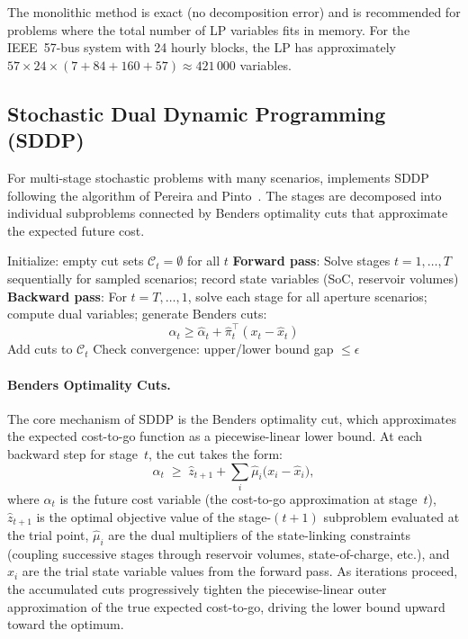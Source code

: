 The monolithic method is exact (no decomposition error) and is recommended
for problems where the total number of LP variables fits in memory.  For
the IEEE~57-bus system with 24 hourly blocks, the LP has approximately
$57 \times 24 \times (7 + 84 + 160 + 57) \approx 421\,000$ variables.

\subsection{Stochastic Dual Dynamic Programming (SDDP)}
\label{sec:sddp}

For multi-stage stochastic problems with many scenarios, \gtopt{} implements
SDDP following the algorithm of Pereira and
Pinto~\cite{pereira1991sddp}.  The stages are decomposed into
individual subproblems connected by Benders optimality cuts that
approximate the expected future cost.

\begin{algorithm}[h]
  \caption{SDDP Algorithm in \gtopt{}}
  \label{alg:sddp}
  \begin{algorithmic}[1]
    \STATE Initialize: empty cut sets $\mathcal{C}_t = \emptyset$
      for all $t$
      \STATE \textbf{Forward pass}: Solve stages $t=1,\ldots,T$
        sequentially for sampled scenarios; record state variables
        (SoC, reservoir volumes)
      \STATE \textbf{Backward pass}: For $t=T,\ldots,1$, solve
        each stage for all aperture scenarios; compute dual
        variables; generate Benders cuts:
        \[
          \alpha_t \geq \hat{\alpha}_t + \hat{\pi}_t^\top
            (x_t - \hat{x}_t)
        \]
      \STATE Add cuts to $\mathcal{C}_t$
      \STATE Check convergence: upper/lower bound gap $\leq \epsilon$
    \ENDFOR
  \end{algorithmic}
\end{algorithm}

\paragraph{Benders Optimality Cuts.}
The core mechanism of SDDP is the Benders optimality cut, which
approximates the expected cost-to-go function as a piecewise-linear
lower bound.  At each backward step for stage~$t$, the cut takes the
form:
\begin{equation}
  \label{eq:benders_cut}
  \alpha_t \;\geq\; \hat{z}_{t+1}
    + \sum_{i} \hat{\mu}_i \bigl(x_i - \hat{x}_i\bigr),
\end{equation}
where $\alpha_t$ is the future cost variable (the cost-to-go
approximation at stage~$t$), $\hat{z}_{t+1}$ is the optimal objective
value of the stage-$(t{+}1)$ subproblem evaluated at the trial point,
$\hat{\mu}_i$ are the dual multipliers of the state-linking constraints
(coupling successive stages through reservoir volumes, state-of-charge,
etc.), and $\hat{x}_i$ are the trial state variable values from the
forward pass.  As iterations proceed, the accumulated cuts progressively
tighten the piecewise-linear outer approximation of the true expected
cost-to-go, driving the lower bound upward toward the optimum.

